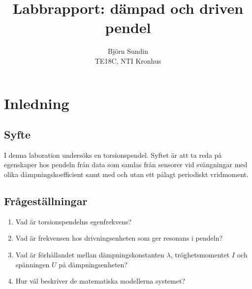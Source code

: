 \documentclass[12pt, a4paper]{article}
\title{Labbrapport: dämpad och driven pendel}
\author{Björn Sundin\medskip\\ TE18C, NTI Kronhus}
\begin{document}
\maketitle

\clearpage
\section{Inledning}
\subsection{Syfte}
I denna laboration undersöks en torsionspendel. Syftet är att ta reda på egenskaper hos pendeln från data som samlas från sensorer vid svängningar med olika dämpnings\-koefficient samt med och utan ett pålagt periodiskt vridmoment.
\subsection{Frågeställningar}
\begin{enumerate}
    \item Vad är torsionspendelns egenfrekvens?
    \item Vad är frekvensen hos drivningsenheten som ger resonans i pendeln?
    \item Vad är förhållandet mellan dämpningskonstanten $\lambda$, tröghetsmomentet $I$ och spänn\-ingen $U$ på dämpningsenheten?
    \item Hur väl beskriver de matematiska modellerna systemet?
\end{enumerate}
\end{document}
